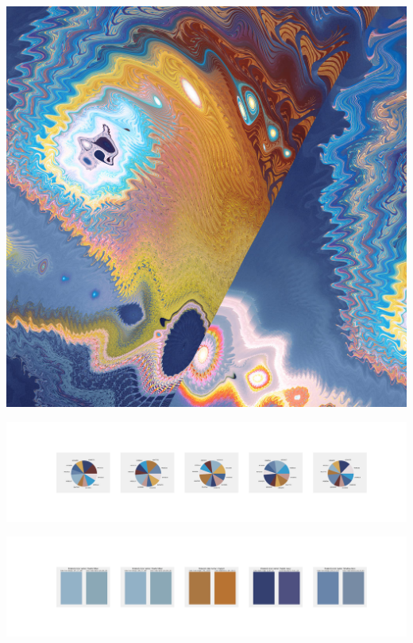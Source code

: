 \documentclass[11pt]{article}
\begin{document}
\begin{landscape}
    \begin{center}
    \includegraphics[width=\textwidth]{./nbimg/file (434).jpg}
    \end{center}

    \begin{center}
    \includegraphics[width=250mm]{./nbimg/pie-372.jpg}
    \end{center}

    \begin{center}
    \includegraphics[width=250mm]{./nbimg/peak-372.jpg}
    \end{center}
    


\end{landscape}
\end{document}
